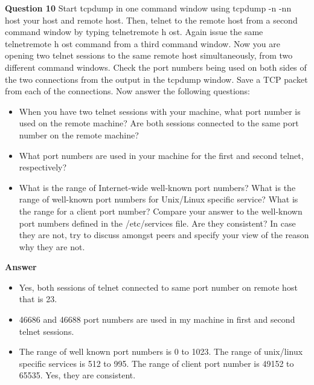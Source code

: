 \documentclass[14pt]{extarticle}
\begin{document}
    \noindent
    \textbf{\large Question 10}
    Start tcpdump in one command window using tcpdump -n -nn host your host and remote host. Then,
    telnet to the remote host from a second command window by typing telnetremote h ost. Again issue
    the same telnetremote h ost command from a third command window. Now you are opening two telnet
    sessions to the same remote host simultaneously, from two different command windows. Check the port
    numbers being used on both sides of the two connections from the output in the tcpdump window. Save
    a TCP packet from each of the connections. Now answer the following questions:

    \begin{itemize}
        \item When you have two telnet sessions with your machine, what port number is used on the remote
        machine? Are both sessions connected to the same port number on the remote machine?
        \item What port numbers are used in your machine for the first and second telnet, respectively?
        \item What is the range of Internet-wide well-known port numbers? What is the range of well-known port
        numbers for Unix/Linux specific service? What is the range for a client port number? Compare
        your answer to the well-known port numbers defined in the /etc/services file. Are they consistent?
        In case they are not, try to discuss amongst peers and specify your view of the reason why they are
        not.
    \end{itemize}
    \textbf{\large Answer}
    \begin{itemize}
        \item Yes, both sessions of telnet connected to same port number on remote host that is 23.
        \item 46686 and 46688 port numbers are used in my machine in first and second telnet sessions.
        \item The range of well known port numbers is 0 to 1023.
        The range of unix/linux specific services is 512 to 995.
        The range of client port number is 49152 to 65535.
        Yes, they are consistent.
    \end{itemize}
    
    \vspace{1cm}
\end{document}
